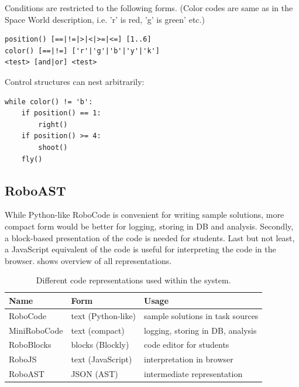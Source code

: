 Conditions %
are restricted to the following forms.
(Color codes are same as in the Space World description,
i.e. 'r' is red, 'g' is green' etc.)
\begin{lstlisting}
position() [==|!=|>|<|>=|<=] [1..6]
color() [==|!=] ['r'|'g'|'b'|'y'|'k']
<test> [and|or] <test>
\end{lstlisting}
Control structures can nest arbitrarily:
\begin{lstlisting}
while color() != 'b':
    if position() == 1:
        right()
    if position() >= 4:
        shoot()
    fly()
\end{lstlisting}


\subsection{RoboAST}

While Python-like RoboCode is convenient for writing sample solutions,
more compact form would be better for logging, storing in DB and analysis.
Secondly, a block-based presentation of the code is needed for students.
Last but not least, a JavaScript equivalent of the code is useful for
interpreting the code in the browser.
 shows overview of all representations.


\begin{table}[htb]
\centering
\begin{tabular}{l l l}
\toprule
Name & Form & Usage  \\
\midrule
RoboCode     & text (Python-like) & sample solutions in task sources  \\
MiniRoboCode & text (compact) & logging, storing in DB, analysis  \\
RoboBlocks   & blocks (Blockly) & code editor for students  \\
RoboJS       & text (JavaScript) & interpretation in browser  \\
RoboAST      & JSON (AST) & intermediate representation \\
\bottomrule
\end{tabular}
\caption{Different code representations used within the system.}
\label{tbl:code-representation}
\end{table}

